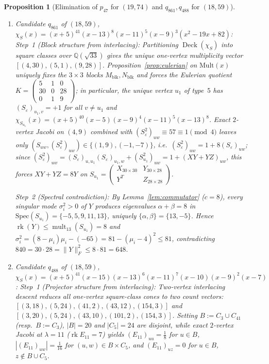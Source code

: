 \documentclass[11pt,reqno]{amsart}
\newtheorem{proposition}[theorem]{Proposition}
\theoremstyle{definition}
\theoremstyle{remark}
\DeclareMathOperator{\rk}{rk}
\DeclareMathOperator{\Deck}{Deck}
\DeclareMathOperator{\mult}{mult}
\begin{document}
\begin{proposition}[Elimination of $p_{47}$ for $(19, 74)$ and $q_{861}, q_{488}$ for $(18, 59)$]
\begin{enumerate}
  \item \emph{Candidate $q_{861}$ of $(18, 59)$, $\chi_S(x) = (x+5)^{41}(x-13)^8(x-11)^5(x-9)^3(x^2 - 19x + 82)$:}
  \emph{Step~1 (Block structure from interlacing):} Partitioning $\Deck(\chi_S)$ into square classes over $\mathbb{Q}(\sqrt{33})$ gives the unique one-vertex multiplicity vector $[(4, 30), (5, 1), (9, 28)]$. Proposition~\ref{prop:eulerian} on $\mathrm{Mult}(x)$ uniquely fixes the $3 \times 3$ blocks $M_{\mathrm{blk}}, N_{\mathrm{blk}}$ and forces the Eulerian quotient $K = \left(\begin{smallmatrix} 5 & 1 & 0 \\ 30 & 0 & 28 \\ 0 & 1 & 9 \end{smallmatrix}\right)$; in particular, the unique vertex $u_1$ of type~$5$ has $(S_\varepsilon)_{u_1, v} = +1$ for all $v \neq u_1$ and $\chi_{S_{u_1}}(x) = (x+5)^{40}(x-5)(x-9)^4(x-11)^5(x-13)^8$. Exact $2$-vertex Jacobi on $(4, 9)$ combined with $(S_\varepsilon^2)_{uw} \equiv 57 \equiv 1 \pmod 4$ leaves only $(S_{uw}, (S_\varepsilon^2)_{uw}) \in \{(1, 9), (-1, -7)\}$, i.e.\ $(S_\varepsilon^2)_{uw} = 1 + 8(S_\varepsilon)_{uw}$; since $(S_\varepsilon^2)_{uw} = (S_\varepsilon)_{u,u_1}(S_\varepsilon)_{u_1,w} + (S_{u_1}^2)_{uw} = 1 + (XY + YZ)_{uw}$, this forces $XY + YZ = 8Y$ on $S_{u_1} = \left(\begin{smallmatrix} X_{30\times 30} & Y_{30\times 28} \\ Y^T & Z_{28\times 28} \end{smallmatrix}\right)$.

  \emph{Step~2 (Spectral contradiction):} By Lemma~\ref{lem:commutator} ($c = 8$), every singular mode $\sigma_i^2 > 0$ of $Y$ produces eigenvalues $\alpha + \beta = 8$ in $\mathrm{Spec}(S_{u_1}) = \{-5, 5, 9, 11, 13\}$, uniquely $\{\alpha, \beta\} = \{13, -5\}$. Hence $\rk(Y) \le \mult_{13}(S_{u_1}) = 8$ and $\sigma_i^2 = (8 - \mu_i)\mu_i - (-65) = 81 - (\mu_i - 4)^2 \le 81$, contradicting $840 = 30 \cdot 28 = \|Y\|_F^2 \le 8 \cdot 81 = 648$.

  \item \emph{Candidate $q_{488}$ of $(18, 59)$, $\chi_S(x) = (x+5)^{41}\allowbreak (x-15)\allowbreak (x-13)^6\allowbreak (x-11)^7\allowbreak (x-10)\allowbreak (x-9)^2\allowbreak (x-7)$:}
  \emph{Step~1 (Projector structure from interlacing):} Two-vertex interlacing descent reduces all one-vertex square-class cones to two count vectors: $[(3, 18),\allowbreak (5, 24),\allowbreak (41, 2),\allowbreak (43, 12),\allowbreak (154, 3)]$ and $[(3, 20),\allowbreak (5, 24),\allowbreak (43, 10),\allowbreak (101, 2),\allowbreak (154, 3)]$. Setting $B := C_3 \cup C_{41}$ (resp.\ $B := C_3$), $|B| = 20$ and $|C_5| = 24$ are disjoint, while exact $2$-vertex Jacobi at $\lambda = 11$ ($\rk E_{11} = 7$) yields $(E_{11})_{uu} = \frac{1}{8}$ for $u \in B$, $|(E_{11})_{uw}| = \frac{1}{16}$ for $(u, w) \in B \times C_5$, and $(E_{11})_{uz} = 0$ for $u \in B$, $z \notin B \cup C_5$.


\end{enumerate}
\end{proposition}
\end{document}
